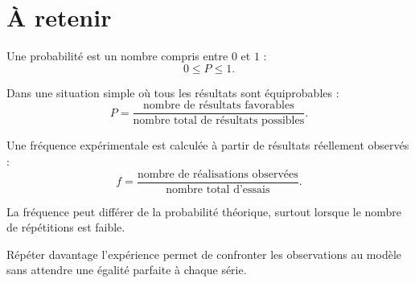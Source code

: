 \section{À retenir}

\begin{aretenir}
Une probabilité est un nombre compris entre $0$ et $1$ :
\[
\boxed{0\le P\le1}.
\]

Dans une situation simple où tous les résultats sont équiprobables :
\[
\boxed{
P=\dfrac{\text{nombre de résultats favorables}}{\text{nombre total de résultats possibles}}
}.
\]

Une fréquence expérimentale est calculée à partir de résultats réellement observés :
\[
\boxed{
f=\dfrac{\text{nombre de réalisations observées}}{\text{nombre total d'essais}}
}.
\]

La fréquence peut différer de la probabilité théorique, surtout lorsque le nombre de répétitions est faible.

Répéter davantage l'expérience permet de confronter les observations au modèle sans attendre une égalité parfaite à chaque série.
\end{aretenir}
